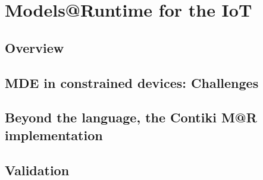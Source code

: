 \chapter{Models@Runtime for the IoT}
\label{sec:MARContiki}

\section{Overview}

\section{MDE in constrained devices: Challenges}

\section{Beyond the language, the Contiki M@R implementation}

\section{Validation}
